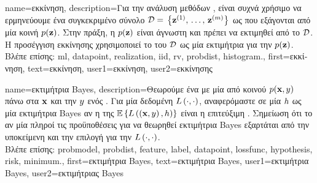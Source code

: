 {name={\foreignlanguage{greek}{εκκίνηση}},
	description={\foreignlanguage{greek}{Για την ανάλυση μεθόδων} 
		, \foreignlanguage{greek}{είναι συχνά χρήσιμο να ερμηνεύουμε ένα συγκεκριμένο σύνολο}  
		 $\mathcal{D} = $ %
		$\big\{ {\bf z}^{(1)}, \,\ldots, \,{\bf z}^{(m)}\big\}$ 
		\foreignlanguage{greek}{ως}    
		\foreignlanguage{greek}{που εξάγονται από μία κοινή}  $p({\bf z})$. 
		\foreignlanguage{greek}{Στην πράξη, η}  $p({\bf z})$ \foreignlanguage{greek}{είναι 
		άγνωστη και πρέπει να εκτιμηθεί από το $\mathcal{D}$. Η προσέγγιση εκκίνησης χρησιμοποιεί το} 
		 \foreignlanguage{greek}{του $\mathcal{D}$ ως μία εκτιμήτρια για την} $p({\bf z})$. \\
		\foreignlanguage{greek}{Βλέπε επίσης:} \gls{ml}, \gls{datapoint}, \gls{realization}, \gls{iid}, \gls{rv}, \gls{probdist}, \gls{histogram}.},
	first={\foreignlanguage{greek}{εκκίνηση}},
	text={\foreignlanguage{greek}{εκκίνηση}},
	user1={\foreignlanguage{greek}{εκκίνηση}}, %
	user2={\foreignlanguage{greek}{εκκίνησης}} %
}

{name={\foreignlanguage{greek}{εκτιμήτρια} Bayes},
	description={\foreignlanguage{greek}{Θεωρούμε ένα} 
		 \foreignlanguage{greek}{με μία από κοινού}  $p({\bf x},y)$ 
		\foreignlanguage{greek}{πάνω στα}  ${\bf x}$ \foreignlanguage{greek}{και την}  
		$y$ \foreignlanguage{greek}{ενός} . \foreignlanguage{greek}{Για μία δεδομένη} 
		 $L\left(\cdot,\cdot \right)$, \foreignlanguage{greek}{αναφερόμαστε σε μία}  
		$h$ \foreignlanguage{greek}{ως μία εκτιμήτρια} Bayes \foreignlanguage{greek}{αν η}  
		\foreignlanguage{greek}{της $\mathbb{E}\left\{L\left(\left( {\bf x},y \right),h \right)\right\}$ είναι η} 
		 \foreignlanguage{greek}{επιτεύξιμη}  \cite{LC}. \foreignlanguage{greek}{Σημείωση 
		ότι το αν μία}  \foreignlanguage{greek}{πληροί τις προϋποθέσεις για να θεωρηθεί εκτιμήτρια} Bayes 
		\foreignlanguage{greek}{εξαρτάται από την υποκείμενη}  \foreignlanguage{greek}{και την επιλογή για 
		την}  $L\left(\cdot,\cdot \right)$.\\
		\foreignlanguage{greek}{Βλέπε επίσης:} \gls{probmodel}, \gls{probdist}, \gls{feature}, \gls{label}, \gls{datapoint}, \gls{lossfunc}, 
		\gls{hypothesis}, \gls{risk}, \gls{minimum}.},
	first={\foreignlanguage{greek}{εκτιμήτρια} Bayes},
	text={\foreignlanguage{greek}{εκτιμήτρια} Bayes},
	user1={\foreignlanguage{greek}{εκτιμήτρια} Bayes}, %
    	user2={\foreignlanguage{greek}{εκτιμήτριας} Bayes} %
}

